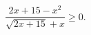 \begin{ex}[type=inequality]
	\begin{condition}
		$ \dfrac{2x + 15 - x^2}{\sqrt{2x + 15} + x}\geqslant0.$
	\end{condition}
\end{ex}